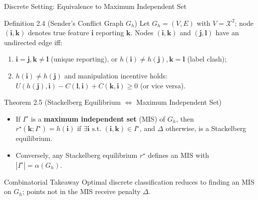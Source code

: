 \documentclass[aspectratio=169, 11pt, t, xcolor=table]{beamer}
\newcommand{\cg}[1]{\mathcal{#1}}
\newcommand{\ibb}{\mathbf{i}}
\newcommand{\jbb}{\mathbf{j}}
\newcommand{\kbb}{\mathbf{k}}
\newcommand{\lbb}{\mathbf{l}}
\newcommand{\rs}{r^{\star}}
\begin{document}
\begin{frame}{Discrete Setting: Equivalence to Maximum Independent Set}
\small
\begin{block}{Definition 2.4 (Sender's Conflict Graph $G_h$)}
\footnotesize
Let $G_h = (V,E)$ with $V = \cg{X}^2$; node $(\ibb,\kbb)$ denotes true feature $\ibb$ reporting $\kbb$.
Nodes $(\ibb,\kbb)$ and $(\jbb,\lbb)$ have an undirected edge iff:
\begin{enumerate}\itemsep=0pt
  \item[(a)] $\ibb = \jbb, \kbb \neq \lbb$ (unique reporting), or $h(\ibb) \neq h(\jbb), \kbb = \lbb$ (label clash);
  \item[(b)] $h(\ibb) \neq h(\jbb)$ and manipulation incentive holds:
  $U(h(\jbb),\ibb) - C(\lbb,\ibb) + C(\kbb,\ibb) \geq 0$ (or vice versa).
\end{enumerate}
\end{block}
\vspace{0.1em}
\begin{block}{Theorem 2.5 (Stackelberg Equilibrium $\Longleftrightarrow$ Maximum Independent Set)}
\footnotesize
\begin{itemize}\itemsep=0pt
  \item[(a)] If $I^\star$ is a \textbf{maximum independent set} (MIS) of $G_h$, then
  $\rs(\kbb; I^\star) = h(\ibb)$ if $\exists \ibb \text{ s.t. } (\ibb,\kbb) \in I^\star$, and $\Delta$ otherwise,
  is a Stackelberg equilibrium.
  \item[(b)] Conversely, any Stackelberg equilibrium $\rs$ defines an MIS with $|I^\star| = \alpha(G_h)$.
\end{itemize}
\end{block}
\vspace{0.1em}
\begin{alertblock}{Combinatorial Takeaway}
\footnotesize
Optimal discrete classification reduces to finding an MIS on $G_h$; points not in the MIS receive penalty $\Delta$.
\end{alertblock}
\end{frame}
\end{document}
